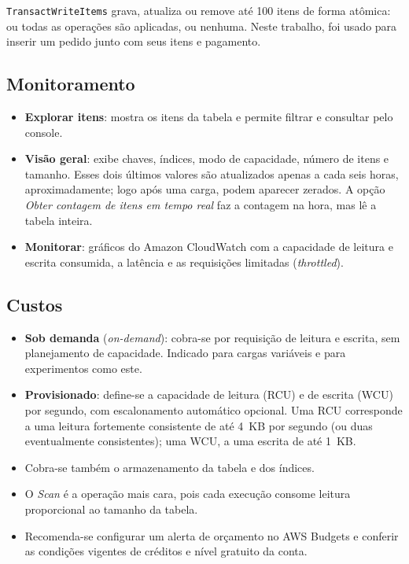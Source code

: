 \documentclass[12pt]{article}
\begin{document}
\texttt{TransactWriteItems} grava, atualiza ou remove até 100 itens de forma
atômica: ou todas as operações são aplicadas, ou nenhuma. Neste trabalho,
foi usado para inserir um pedido junto com seus itens e pagamento.

\subsection{Monitoramento}

\begin{itemize}
  \item \textbf{Explorar itens}: mostra os itens da tabela e permite filtrar
  e consultar pelo console.
  \item \textbf{Visão geral}: exibe chaves, índices, modo de capacidade,
  número de itens e tamanho. Esses dois últimos valores são atualizados apenas
  a cada seis horas, aproximadamente; logo após uma carga, podem aparecer
  zerados. A opção \textit{Obter contagem de itens em tempo real} faz a
  contagem na hora, mas lê a tabela inteira.
  \item \textbf{Monitorar}: gráficos do Amazon CloudWatch com a capacidade de
  leitura e escrita consumida, a latência e as requisições limitadas
  (\textit{throttled}).
\end{itemize}

\subsection{Custos}

\begin{itemize}
  \item \textbf{Sob demanda} (\textit{on-demand}): cobra-se por requisição
  de leitura e escrita, sem planejamento de capacidade. Indicado para cargas
  variáveis e para experimentos como este.
  \item \textbf{Provisionado}: define-se a capacidade de leitura (RCU) e de
  escrita (WCU) por segundo, com escalonamento automático opcional. Uma RCU
  corresponde a uma leitura fortemente consistente de até 4~KB por segundo
  (ou duas eventualmente consistentes); uma WCU, a uma escrita de até 1~KB.
  \item Cobra-se também o armazenamento da tabela e dos índices.
  \item O \textit{Scan} é a operação mais cara, pois cada execução consome
  leitura proporcional ao tamanho da tabela.
  \item Recomenda-se configurar um alerta de orçamento no AWS Budgets e
  conferir as condições vigentes de créditos e nível gratuito da conta.
\end{itemize}
\end{document}
